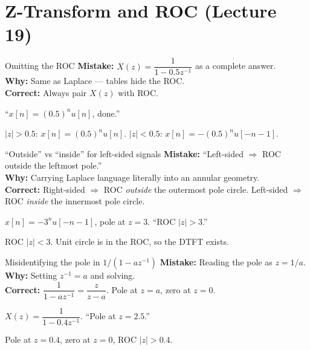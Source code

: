 \documentclass[11pt]{article}
\begin{document}
\section{Z-Transform and ROC (Lecture 19)}

\begin{pitfallbox}{Omitting the ROC}
\textbf{Mistake:} $X(z) = \dfrac{1}{1-0.5z^{-1}}$ as a complete answer.\\
\textbf{Why:} Same as Laplace --- tables hide the ROC.\\
\textbf{Correct:} Always pair $X(z)$ with ROC.
\begin{wrongbox}
``$x[n] = (0.5)^n u[n]$, done.''
\end{wrongbox}
\begin{rightbox}
$|z|>0.5$: $x[n] = (0.5)^n u[n]$. $|z|<0.5$: $x[n] = -(0.5)^n u[-n-1]$.
\end{rightbox}
\end{pitfallbox}

\begin{pitfallbox}{``Outside'' vs ``inside'' for left-sided signals}
\textbf{Mistake:} ``Left-sided $\Rightarrow$ ROC outside the leftmost pole.''\\
\textbf{Why:} Carrying Laplace language literally into an annular geometry.\\
\textbf{Correct:} Right-sided $\Rightarrow$ ROC \emph{outside} the outermost pole circle. Left-sided $\Rightarrow$ ROC \emph{inside} the innermost pole circle.
\begin{wrongbox}
$x[n] = -3^n u[-n-1]$, pole at $z=3$. ``ROC $|z|>3$.''
\end{wrongbox}
\begin{rightbox}
ROC $|z|<3$. Unit circle is in the ROC, so the DTFT exists.
\end{rightbox}
\end{pitfallbox}

\begin{pitfallbox}{Misidentifying the pole in $1/(1-az^{-1})$}
\textbf{Mistake:} Reading the pole as $z=1/a$.\\
\textbf{Why:} Setting $z^{-1}=a$ and solving.\\
\textbf{Correct:} $\dfrac{1}{1-az^{-1}} = \dfrac{z}{z-a}$. Pole at $z=a$, zero at $z=0$.
\begin{wrongbox}
$X(z) = \dfrac{1}{1-0.4z^{-1}}$. ``Pole at $z=2.5$.''
\end{wrongbox}
\begin{rightbox}
Pole at $z=0.4$, zero at $z=0$, ROC $|z|>0.4$.
\end{rightbox}
\end{pitfallbox}
\end{document}
